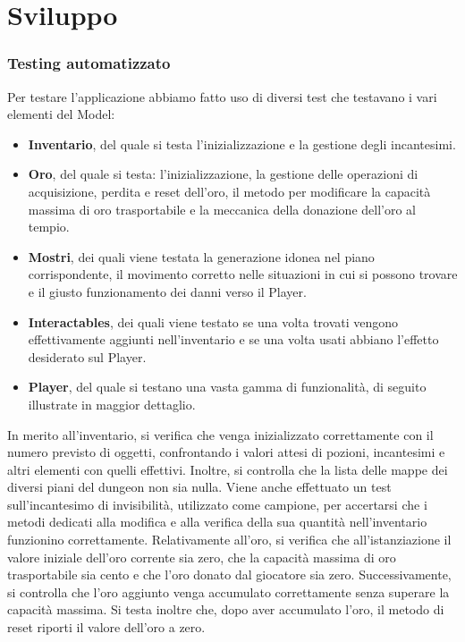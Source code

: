 \documentclass{report}
\begin{document}
\chapter{Sviluppo}

\subsection{Testing automatizzato}
Per testare l'applicazione abbiamo fatto uso di diversi test che testavano i vari elementi del Model:
\begin{itemize}
    \item \textbf{Inventario}, del quale si testa l’inizializzazione e la gestione degli incantesimi.
    \item \textbf{Oro}, del quale si testa: l’inizializzazione, la gestione delle operazioni di acquisizione, perdita e reset dell’oro, il metodo per modificare la capacità massima di oro trasportabile e la meccanica della donazione dell’oro al tempio.
    \item \textbf{Mostri}, dei quali viene testata la generazione idonea nel piano corrispondente, il movimento corretto nelle situazioni in cui si possono trovare e il giusto funzionamento dei danni verso il Player.
    \item \textbf{Interactables}, dei quali viene testato se una volta trovati vengono effettivamente aggiunti nell'inventario e se una volta usati abbiano l'effetto desiderato sul Player.
    \item \textbf{Player}, del quale si testano una vasta gamma di funzionalità, di seguito illustrate in maggior dettaglio.
\end{itemize} 
%
In merito all'inventario, si verifica che venga inizializzato correttamente con il numero previsto di oggetti, confrontando i valori attesi di pozioni, incantesimi e altri elementi con quelli effettivi. Inoltre, si controlla che 
%
la lista delle mappe dei diversi piani del dungeon non sia nulla. \newline
%
Viene anche effettuato un test sull’incantesimo di invisibilità, utilizzato come campione, per accertarsi che i metodi dedicati alla modifica e alla verifica della sua quantità nell’inventario funzionino correttamente. \newline
%
Relativamente all’oro, si verifica che all’istanziazione il valore iniziale dell’oro corrente sia zero, che la capacità massima di oro trasportabile sia cento e che l’oro donato dal giocatore sia zero. Successivamente, 
%
si controlla che l’oro aggiunto venga accumulato correttamente senza superare la capacità massima. Si testa inoltre che, dopo aver accumulato l’oro, il metodo di reset riporti il valore dell’oro a zero. \newline
\end{document}
